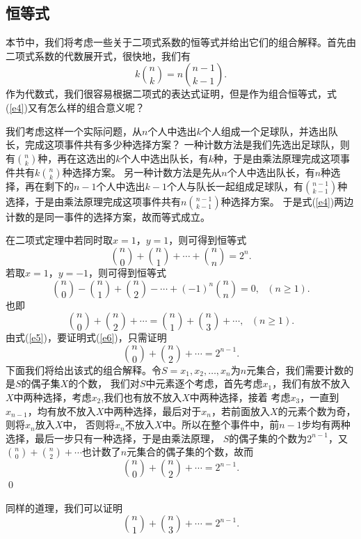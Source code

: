 \subsection{恒等式}
本节中，我们将考虑一些关于二项式系数的恒等式并给出它们的组合解释。首先由二项式系数的代数展开式，很快地，我们有
\begin{equation}\label{e4}
k{n\choose k}=n{n-1 \choose k-1}.
\end{equation}
作为代数式，我们很容易根据二项式的表达式证明，但是作为组合恒等式，式(\ref{e4})又有怎么样的组合意义呢？

我们考虑这样一个实际问题，从$n$个人中选出$k$个人组成一个足球队，并选出队长，完成这项事件共有多少种选择方案？
一种计数方法是我们先选出足球队，则有${n\choose
k}$种，再在这选出的$k$个人中选出队长，有$k$种，于是由乘法原理完成这项事件共有$k{n\choose
k}$种选择方案。
另一种计数方法是先从$n$个人中选出队长，有$n$种选择，再在剩下的$n-1$个人中选出$k-1$个人与队长一起组成足球队，有${n-1\choose
k-1}$种选择，于是由乘法原理完成这项事件共有$n{n-1 \choose
k-1}$种选择方案。
于是式(\ref{e4})两边计数的是同一事件的选择方案，故而等式成立。

在二项式定理中若同时取$x=1$，$y=1$，则可得到恒等式
\begin{equation}\label{e5}
{n\choose 0}+{n\choose 1}+\cdots+{n\choose n}=2^n.
\end{equation}
若取$x=1$，$y=-1$，则可得到恒等式
$${n\choose 0}-{n\choose 1}+{n\choose 2}-\cdots+(-1)^n{n\choose n}=0,\ \ \ (n\geq 1).
$$
也即
\begin{equation}\label{e6}
{n\choose 0}+{n\choose 2}+\cdots={n\choose 1}+{n\choose 3}+\cdots,\
\ \ (n\geq 1).
\end{equation}
由式(\ref{e5})，要证明式(\ref{e6})，只需证明
$${n\choose 0}+{n\choose 2}+\cdots=2^{n-1}.$$
下面我们将给出该式的组合解释。令$S={x_1,x_2,\ldots,x_n}$为$n$元集合，我们需要计数的是$S$的偶子集$X$的个数，
我们对$S$中元素逐个考虑，首先考虑$x_1$，我们有放不放入$X$中两种选择，考虑$x_2$,我们也有放不放入$X$中两种选择，接着
考虑$x_3$，一直到$x_{n-1}$，均有放不放入$X$中两种选择，最后对于$x_n$，若前面放入$X$的元素个数为奇，则将$x_n$放入$X$中，
否则将$x_n$不放入$X$中。所以在整个事件中，前$n-1$步均有两种选择，最后一步只有一种选择，于是由乘法原理，
$S$的偶子集的个数为$2^{n-1}$，又${n\choose 0}+{n\choose
2}+\cdots$也计数了$n$元集合的偶子集的个数，故而
$${n\choose 0}+{n\choose 2}+\cdots=2^{n-1}.$$
\qed

同样的道理，我们可以证明$${n\choose 1}+{n\choose
3}+\cdots=2^{n-1}.$$


